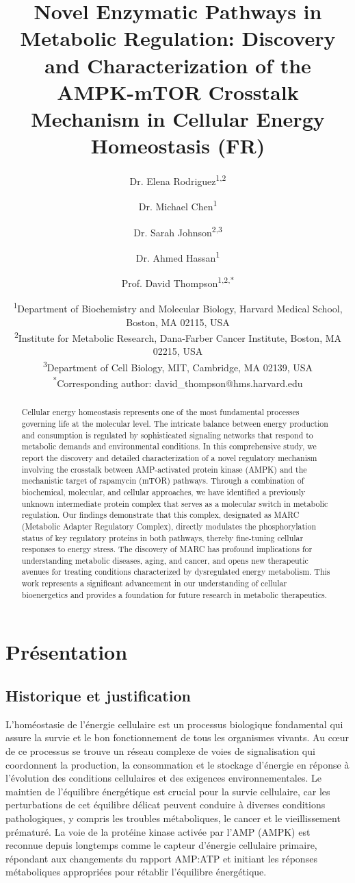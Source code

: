 \documentclass[11pt,a4paper]{article}
\title{Novel Enzymatic Pathways in Metabolic Regulation: Discovery and Characterization of the AMPK-mTOR Crosstalk Mechanism in Cellular Energy Homeostasis (FR)}
\author{Dr. Elena Rodriguez\textsuperscript{1,2} \and 
        Dr. Michael Chen\textsuperscript{1} \and 
        Dr. Sarah Johnson\textsuperscript{2,3} \and 
        Dr. Ahmed Hassan\textsuperscript{1} \and 
        Prof. David Thompson\textsuperscript{1,2,*}}
\date{\textsuperscript{1}Department of Biochemistry and Molecular Biology, Harvard Medical School, Boston, MA 02115, USA\\
\textsuperscript{2}Institute for Metabolic Research, Dana-Farber Cancer Institute, Boston, MA 02215, USA\\
\textsuperscript{3}Department of Cell Biology, MIT, Cambridge, MA 02139, USA\\
\textsuperscript{*}Corresponding author: david\_thompson@hms.harvard.edu}
\begin{document}
\maketitle

\begin{abstract}
Cellular energy homeostasis represents one of the most fundamental processes governing life at the molecular level. The intricate balance between energy production and consumption is regulated by sophisticated signaling networks that respond to metabolic demands and environmental conditions. In this comprehensive study, we report the discovery and detailed characterization of a novel regulatory mechanism involving the crosstalk between AMP-activated protein kinase (AMPK) and the mechanistic target of rapamycin (mTOR) pathways. Through a combination of biochemical, molecular, and cellular approaches, we have identified a previously unknown intermediate protein complex that serves as a molecular switch in metabolic regulation. Our findings demonstrate that this complex, designated as MARC (Metabolic Adapter Regulatory Complex), directly modulates the phosphorylation status of key regulatory proteins in both pathways, thereby fine-tuning cellular responses to energy stress. The discovery of MARC has profound implications for understanding metabolic diseases, aging, and cancer, and opens new therapeutic avenues for treating conditions characterized by dysregulated energy metabolism. This work represents a significant advancement in our understanding of cellular bioenergetics and provides a foundation for future research in metabolic therapeutics.
\end{abstract}

\newpage

\tableofcontents

\newpage

\section{Présentation}

\subsection{Historique et justification}

L'homéostasie de l'énergie cellulaire est un processus biologique fondamental qui assure la survie et le bon fonctionnement de tous les organismes vivants. Au cœur de ce processus se trouve un réseau complexe de voies de signalisation qui coordonnent la production, la consommation et le stockage d'énergie en réponse à l'évolution des conditions cellulaires et des exigences environnementales. Le maintien de l'équilibre énergétique est crucial pour la survie cellulaire, car les perturbations de cet équilibre délicat peuvent conduire à diverses conditions pathologiques, y compris les troubles métaboliques, le cancer et le vieillissement prématuré. La voie de la protéine kinase activée par l'AMP (AMPK) est reconnue depuis longtemps comme le capteur d'énergie cellulaire primaire, répondant aux changements du rapport AMP:ATP et initiant les réponses métaboliques appropriées pour rétablir l'équilibre énergétique.
\end{document}
